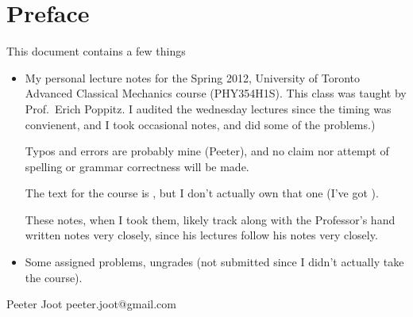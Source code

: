 \chapter*{Preface}\normalsize

This document contains a few things

\begin{itemize}
\item My personal lecture notes for the Spring 2012, University of Toronto Advanced Classical Mechanics course (PHY354H1S).  This class was taught by Prof.\ Erich Poppitz.  I audited the wednesday lectures since the timing was convienent, and I took occasional notes, and did some of the problems.)

Typos and errors are probably mine (Peeter), and no claim nor attempt of spelling or grammar correctness will be made.  

The text for the course is \citep{landau1960classical}, but I don't actually own that one (I've got \cite{goldstein1951cm}).

These notes, when I took them, likely track along with the Professor's hand written notes very closely, since his lectures follow his notes very closely.

\item Some assigned problems, ungrades (not submitted since I didn't actually take the course).

%
\end{itemize}

Peeter Joot  \quad peeter.joot@gmail.com 
